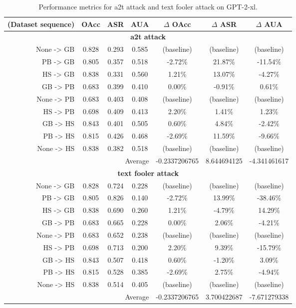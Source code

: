 \documentclass{article}
\begin{document}
\FloatBarrier

\begin{table}[ht]
\centering
\caption{Performance metrics for a2t attack and text fooler attack on GPT-2-xl.}
\small
\begin{tabular}{r|ccc|ccc}
\hline
\textbf{(Dataset sequence)} & \textbf{OAcc} & \textbf{ASR} & \textbf{AUA} & \textbf{$\Delta$ OAcc} & \textbf{$\Delta$ ASR} & \textbf{$\Delta$ AUA} \\ \hline
\multicolumn{7}{c}{\textbf{a2t attack}} \\ \hline
None -> GB & 0.828 & 0.293 & 0.585 & (baseline) & (baseline) & (baseline) \\
PB -> GB & 0.805 & 0.357 & 0.518 & -2.72\% & 21.87\% & -11.54\% \\
HS -> GB & 0.838 & 0.331 & 0.560 & 1.21\% & 13.07\% & -4.27\% \\
GB -> PB & 0.683 & 0.399 & 0.410 & 0.00\% & -0.91\% & 0.61\% \\
None -> PB & 0.683 & 0.403 & 0.408 & (baseline) & (baseline) & (baseline) \\
HS -> PB & 0.698 & 0.409 & 0.413 & 2.20\% & 1.41\% & 1.23\% \\
GB -> HS & 0.843 & 0.401 & 0.505 & 0.60\% & 4.84\% & -2.42\% \\
PB -> HS & 0.815 & 0.426 & 0.468 & -2.69\% & 11.59\% & -9.66\% \\
None -> HS & 0.838 & 0.382 & 0.518 & (baseline) & (baseline) & (baseline) \\ \hline
\multicolumn{4}{r|}{Average} & -0.2337206765 & 8.644694125 & -4.341461617 \\ \hline
\multicolumn{7}{c}{\textbf{text fooler attack}} \\ \hline
None -> GB & 0.828 & 0.724 & 0.228 & (baseline) & (baseline) & (baseline) \\
PB -> GB & 0.805 & 0.826 & 0.140 & -2.72\% & 13.99\% & -38.46\% \\
HS -> GB & 0.838 & 0.690 & 0.260 & 1.21\% & -4.79\% & 14.29\% \\
GB -> PB & 0.683 & 0.665 & 0.228 & 0.00\% & 2.06\% & -4.21\% \\
None -> PB & 0.683 & 0.652 & 0.238 & (baseline) & (baseline) & (baseline) \\
HS -> PB & 0.698 & 0.713 & 0.200 & 2.20\% & 9.39\% & -15.79\% \\
GB -> HS & 0.843 & 0.507 & 0.418 & 0.60\% & -1.20\% & 3.09\% \\
PB -> HS & 0.815 & 0.528 & 0.385 & -2.69\% & 2.75\% & -4.94\% \\
None -> HS & 0.838 & 0.514 & 0.405 & (baseline) & (baseline) & (baseline) \\ \hline
\multicolumn{4}{r|}{Average} & -0.2337206765 & 3.700422687 & -7.671279338 \\ \hline
\end{tabular}
\label{table:gpt2_xl_attack_comparison}
\end{table}
\end{document}
